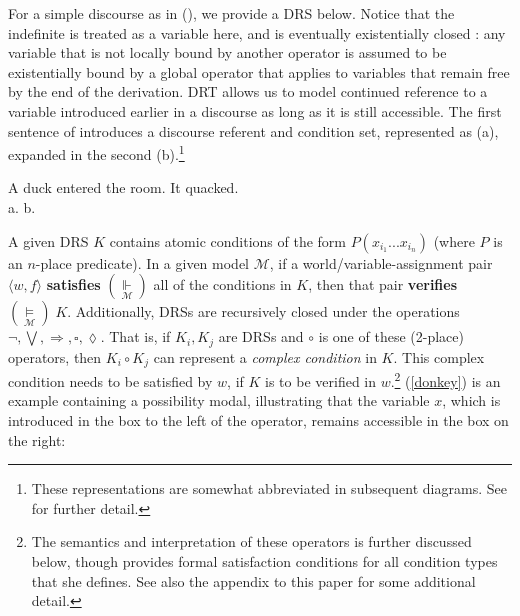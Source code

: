 For a simple discourse as in (\nextx), we provide a DRS below. Notice that the indefinite is treated as a variable here, and is eventually existentially closed \citep{Heim}: any variable that is not locally bound by another operator is assumed to be existentially bound by a global operator that applies to variables that remain free by the end of the derivation. DRT allows us to model continued reference to a variable introduced earlier in a discourse as long as it is still accessible. The first sentence of  introduces a discourse referent and condition set, represented as (a), expanded in the second (b).\footnote{These representations are somewhat abbreviated in subsequent diagrams. See \citet{Kamp1993} for further detail.}


	\pex A duck entered the room. It quacked.\\
		a.  \hspace*{1in}	b. 

	\xe
	

\vspace{1em}

A given DRS $ K $ contains atomic conditions of the form $ P(x_{i_1}...x_{i_n}) $ (where $ P $ is an $ n $-place predicate). In a given model $ \mathcal M $, if a world/variable-assignment pair $ \langle w,f\rangle $ \textbf{satisfies} $ (\underset{\scriptscriptstyle{\mathcal M}}{\boldsymbol{\Vdash}}) $ all of the conditions in $ K $, then that pair \textbf{verifies} $(\underset{\scriptscriptstyle{\mathcal M}}{\boldsymbol{\vDash}}) \;K$. Additionally, DRSs are recursively closed under the operations $ \neg,\bigvee,\Rightarrow,\square,\lozenge $. That is, if $ K_i,K_j $ are DRSs and $ \circ $ is one of these (2-place) operators, then $ K_i\circ K_j $ can represent a \textit{complex condition} in $ K $. This complex condition needs to be satisfied by $ w $, if $ K $ is to be verified in $ w $.\footnote{The semantics and interpretation of these operators is further discussed below, though \citet[714]{Roberts1989} provides formal satisfaction conditions for all condition types that she defines. See also the appendix to this paper for some additional detail.} (\ref{donkey}) is an example containing a possibility modal, illustrating that the variable $x$, which is introduced in the box to the left of the operator, remains accessible in the box on the right: 


